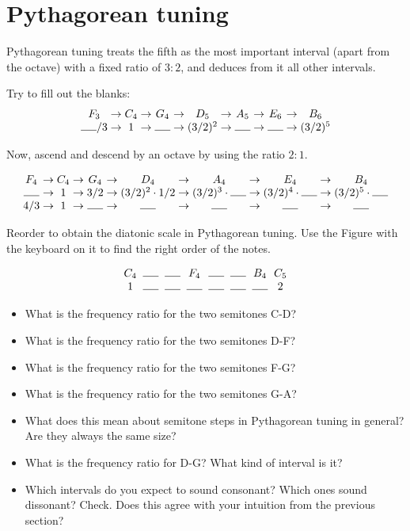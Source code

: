 \documentclass[a4paper, 11pt]{article}
\newcommand{\answerline}[1][0.5cm]{%
    \noindent\rule{#1}{0.4pt}
}
\begin{document}
\section{Pythagorean tuning}
Pythagorean tuning treats the fifth as the most important interval (apart from the octave) with a fixed ratio of $3:2$, and deduces from it all other intervals. 

Try to fill out the blanks:
\[
\begin{array}{c@{\;\rightarrow\;}c@{\;\rightarrow\;}c@{\;\rightarrow\;}c@{\;\rightarrow\;}c@{\;\rightarrow\;}c@{\;\rightarrow\;}c}
F_3 & C_4 & G_4 & D_5 & A_5 & E_6 & B_6 \\
\answerline/3 & 1 & \answerline & (3/2)^2 & \answerline & \answerline & (3/2)^5
\end{array}
\]

Now, ascend and descend by an octave by using the ratio $2:1$.

\[
\begin{array}{c@{\;\rightarrow\;}c@{\;\rightarrow\;}c@{\;\rightarrow\;}c@{\;\rightarrow\;}c@{\;\rightarrow\;}c@{\;\rightarrow\;}c}
F_4 & C_4 & G_4 & D_4 & A_4 & E_4 & B_4 \\
\answerline & 1 & 3/2 & (3/2)^2 \cdot 1/2 & (3/2)^3 \cdot \answerline & (3/2)^4 \cdot \answerline& (3/2)^5  \cdot \answerline \\
4/3& 1& \answerline & \answerline & \answerline & \answerline & \answerline
\end{array} \\
\]

Reorder to obtain the diatonic scale in Pythagorean tuning. Use the Figure with the keyboard on it to find the right order of the notes.

\[
\begin{array}{c@{\;\;}c@{\;\;}c@{\;\;}c@{\;\;}c@{\;\;}c@{\;\;}c@{\;\;}c}
C_4 & \answerline & \answerline & F_4 & \answerline & \answerline & B_4 & C_5 \\
1 & \answerline & \answerline & \answerline & \answerline & \answerline & \answerline & 2
\end{array} \\
\]

\begin{itemize}
    \item What is the frequency ratio for the two semitones C-D?
    \item What is the frequency ratio for the two semitones D-F?
    \item What is the frequency ratio for the two semitones F-G?
    \item What is the frequency ratio for the two semitones G-A?
    \item What does this mean about semitone steps in Pythagorean tuning in general? Are they always the same size?
    \item What is the frequency ratio for D-G? What kind of interval is it?
    \item Which intervals do you expect to sound consonant? Which ones sound dissonant? Check. Does this agree with your intuition from the previous section?
\end{itemize}
\end{document}
